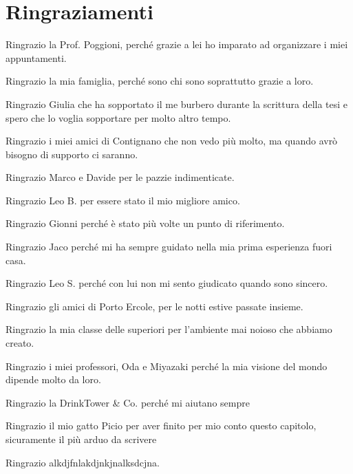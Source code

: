 \chapter*{Ringraziamenti}

\begingroup
\setlength{\parskip}{0.6\baselineskip}
\setlength{\parindent}{0pt}

Ringrazio la Prof. Poggioni, perché grazie a lei ho imparato ad organizzare i miei appuntamenti.

Ringrazio la mia famiglia, perché sono chi sono soprattutto grazie a loro.

Ringrazio Giulia che ha sopportato il me burbero durante la scrittura della tesi e spero che lo voglia sopportare per molto altro tempo.

Ringrazio i miei amici di Contignano che non vedo più molto, ma quando avrò bisogno di supporto ci saranno.

Ringrazio Marco e Davide per le pazzie indimenticate.

Ringrazio Leo B. per essere stato il mio migliore amico.

Ringrazio Gionni perché è stato più volte un punto di riferimento.

Ringrazio Jaco perché mi ha sempre guidato nella mia prima esperienza fuori casa.

Ringrazio Leo S. perché con lui non mi sento giudicato quando sono sincero.

Ringrazio gli amici di Porto Ercole, per le notti estive passate insieme.

Ringrazio la mia classe delle superiori per l'ambiente mai noioso che abbiamo creato.

Ringrazio i miei professori, Oda e Miyazaki perché la mia visione del mondo dipende molto da loro.

Ringrazio la DrinkTower \& Co. perché mi aiutano sempre

Ringrazio il mio gatto Picio per aver finito per mio conto questo capitolo, sicuramente il più arduo da scrivere

Ringrazio alkdjfnlakdjnkjnalksdcjna.

\par
\endgroup
